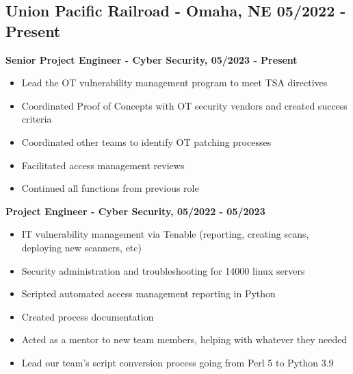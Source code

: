 \documentclass[a4paper,10pt]{article}
\begin{document}
\subsection*{Union Pacific Railroad - Omaha, NE \hfill 05/2022 - Present}
\textbf{Senior Project Engineer - Cyber Security, 05/2023 - Present}
\begin{itemize}
    \item Lead the OT vulnerability management program to meet TSA directives
    \item Coordinated Proof of Concepts with OT security vendors and created success criteria
    \item Coordinated other teams to identify OT patching processes
    \item Facilitated access management reviews
    \item Continued all functions from previous role
\end{itemize}
\textbf{Project Engineer - Cyber Security, 05/2022 - 05/2023}
\begin{itemize}
    \item IT vulnerability management via Tenable (reporting, creating scans, deploying new scanners, etc)
    \item Security administration and troubleshooting for 14000 linux servers
    \item Scripted automated access management reporting in Python
    \item Created process documentation
    \item Acted as a mentor to new team members, helping with whatever they needed
    \item Lead our team's script conversion process going from Perl 5 to Python 3.9
\end{itemize}
\end{document}
